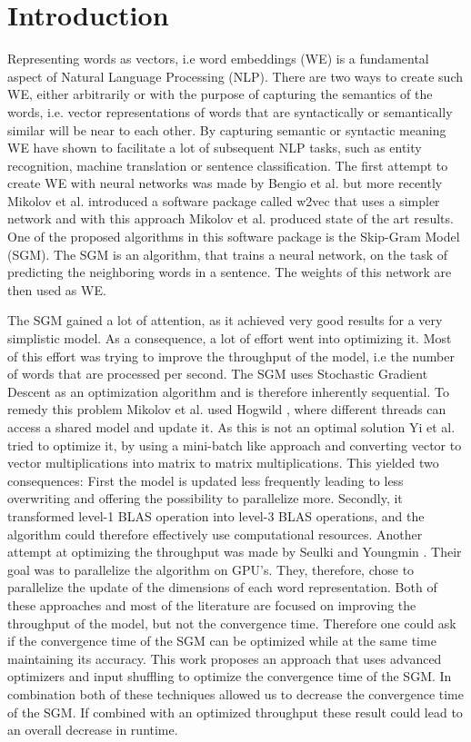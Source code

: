 \chapter{Introduction}\label{chap:introduction}

Representing words as vectors, i.e word embeddings (WE) is a fundamental aspect of Natural Language Processing (NLP). There are two ways to create such WE, either arbitrarily or with the purpose of capturing the semantics of the words, i.e. vector representations of words that are syntactically or semantically similar will be near to each other. By capturing semantic or syntactic meaning WE have shown to facilitate a lot of subsequent NLP tasks, such as entity recognition, machine translation or sentence classification.  The first attempt to create WE with neural networks was made by Bengio et al. \cite{bengio} but more recently Mikolov et al. \cite{mikolov} introduced a software package called w2vec that uses a simpler network and with this approach Mikolov et al. produced state of the art results. One of the proposed algorithms in this software package is the Skip-Gram Model (SGM). The SGM is an algorithm, that trains a neural network, on the task of predicting the neighboring words in a sentence. The weights of this network are then used as WE. 

The SGM gained a lot of attention, as it achieved very good results for a very simplistic model. As a consequence, a lot of effort went into optimizing it. Most of this effort was trying to improve the throughput of the model, i.e the number of words that are processed per second. The SGM uses Stochastic Gradient Descent as an optimization algorithm and is therefore inherently sequential. To remedy this problem Mikolov et al. used Hogwild \cite{hogwild}, where different threads can access a shared model and update it. As this is not an optimal solution Yi et al. \cite{intel} tried to optimize it, by using a mini-batch like approach and converting vector to vector multiplications into matrix to matrix multiplications. This yielded two consequences: First the model is updated less frequently leading to less overwriting and offering the possibility to parallelize more. Secondly, it transformed level-1 BLAS operation into level-3 BLAS operations, and the algorithm could therefore effectively use computational resources. Another attempt at optimizing the throughput was made by Seulki and Youngmin \cite{gpu}. Their goal was to parallelize the algorithm on GPU's. They, therefore, chose to parallelize the update of the dimensions of each word representation. Both of these approaches and most of the literature are focused on improving the throughput of the model, but not the convergence time.  Therefore one could ask if the convergence time of the SGM can be optimized while at the same time maintaining its accuracy. This work proposes an approach that uses advanced optimizers and input shuffling to optimize the convergence time of the SGM. In combination both of these techniques allowed us to decrease the convergence time of the SGM. If combined with an optimized throughput these result could lead to an overall decrease in runtime.

